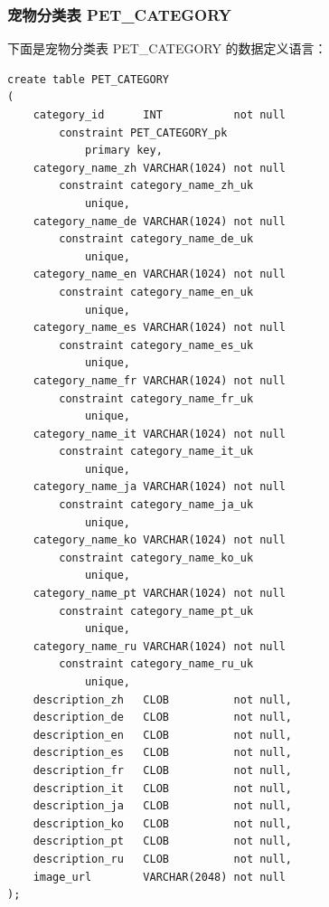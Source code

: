 \subsubsection{宠物分类表 PET\_CATEGORY}

下面是宠物分类表 PET\_CATEGORY 的数据定义语言：

\begin{verbatim}
create table PET_CATEGORY
(
    category_id      INT           not null
        constraint PET_CATEGORY_pk
            primary key,
    category_name_zh VARCHAR(1024) not null
        constraint category_name_zh_uk
            unique,
    category_name_de VARCHAR(1024) not null
        constraint category_name_de_uk
            unique,
    category_name_en VARCHAR(1024) not null
        constraint category_name_en_uk
            unique,
    category_name_es VARCHAR(1024) not null
        constraint category_name_es_uk
            unique,
    category_name_fr VARCHAR(1024) not null
        constraint category_name_fr_uk
            unique,
    category_name_it VARCHAR(1024) not null
        constraint category_name_it_uk
            unique,
    category_name_ja VARCHAR(1024) not null
        constraint category_name_ja_uk
            unique,
    category_name_ko VARCHAR(1024) not null
        constraint category_name_ko_uk
            unique,
    category_name_pt VARCHAR(1024) not null
        constraint category_name_pt_uk
            unique,
    category_name_ru VARCHAR(1024) not null
        constraint category_name_ru_uk
            unique,
    description_zh   CLOB          not null,
    description_de   CLOB          not null,
    description_en   CLOB          not null,
    description_es   CLOB          not null,
    description_fr   CLOB          not null,
    description_it   CLOB          not null,
    description_ja   CLOB          not null,
    description_ko   CLOB          not null,
    description_pt   CLOB          not null,
    description_ru   CLOB          not null,
    image_url        VARCHAR(2048) not null
);


\end{verbatim}
